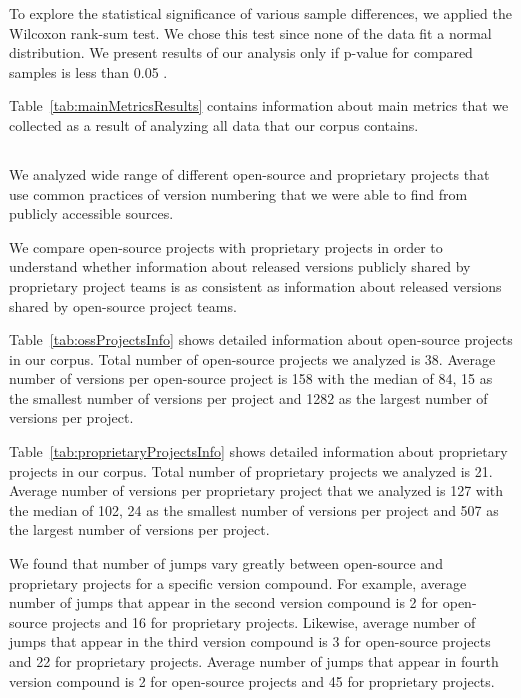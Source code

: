 \documentclass[conference]{IEEEtran}
\begin{document}
To explore the statistical significance of various sample differences, we applied the Wilcoxon rank-sum test. We chose this test since none of the data fit a normal distribution. We present results of our analysis only if p-value for compared samples is less than 0.05 . 

Table~\ref{tab:mainMetricsResults} contains information about main metrics that we collected as a result of analyzing all data that our corpus contains. 

\subsection{\RQOne}

We analyzed wide range of different open-source and proprietary projects that use common practices of version numbering that we were able to find from publicly accessible sources. 

We compare open-source projects with proprietary projects in order to understand whether information about released versions publicly shared by proprietary project teams is as consistent as information about released versions shared by open-source project teams.

Table~\ref{tab:ossProjectsInfo} shows detailed information about open-source projects in our corpus. Total number of open-source projects we analyzed is 38. Average number of versions per open-source project is 158 with the median of 84, 15 as the smallest number of versions per project and 1282 as the largest number of versions per project. 

Table~\ref{tab:proprietaryProjectsInfo} shows detailed information about proprietary projects in our corpus. Total number of proprietary projects we analyzed is 21. Average number of versions per proprietary project that we analyzed is 127 with the median of 102, 24 as the smallest number of versions per project and 507 as the largest number of versions per project. 

We found that number of jumps vary greatly between open-source and proprietary projects for a specific version compound. For example, average number of jumps that appear in the second version compound is 2 for open-source projects and 16 for proprietary projects. Likewise, average number of jumps that appear in the third version compound is 3 for open-source projects and 22 for proprietary projects. Average number of jumps that appear in fourth version compound is 2 for open-source projects and 45 for proprietary projects. 
\end{document}
